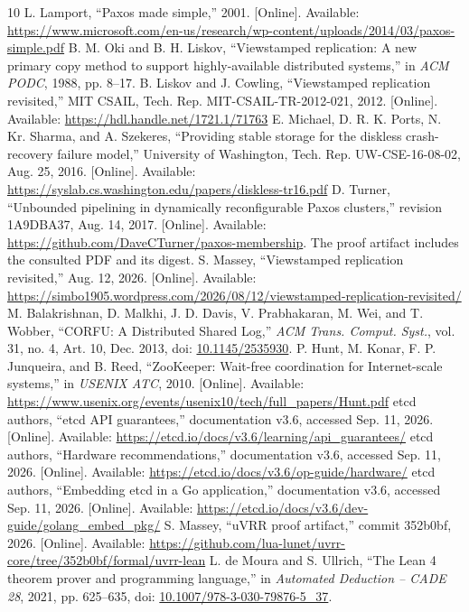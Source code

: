 \documentclass[10pt,journal,letterpaper]{IEEEtran}
\begin{document}
\begin{thebibliography}{10}
 L. Lamport, ``Paxos made simple,'' 2001. [Online]. Available: \url{https://www.microsoft.com/en-us/research/wp-content/uploads/2014/03/paxos-simple.pdf}
 B. M. Oki and B. H. Liskov, ``Viewstamped replication: A new primary copy method to support highly-available distributed systems,'' in \emph{ACM PODC}, 1988, pp. 8--17.
 B. Liskov and J. Cowling, ``Viewstamped replication revisited,'' MIT CSAIL, Tech. Rep. MIT-CSAIL-TR-2012-021, 2012. [Online]. Available: \url{https://hdl.handle.net/1721.1/71763}
 E. Michael, D. R. K. Ports, N. Kr. Sharma, and A. Szekeres, ``Providing stable storage for the diskless crash-recovery failure model,'' University of Washington, Tech. Rep. UW-CSE-16-08-02, Aug. 25, 2016. [Online]. Available: \url{https://syslab.cs.washington.edu/papers/diskless-tr16.pdf}
 D. Turner, ``Unbounded pipelining in dynamically reconfigurable Paxos clusters,'' revision 1A9DBA37, Aug. 14, 2017. [Online]. Available: \url{https://github.com/DaveCTurner/paxos-membership}. The proof artifact includes the consulted PDF and its digest.
 S. Massey, ``Viewstamped replication revisited,'' Aug. 12, 2026. [Online]. Available: \url{https://simbo1905.wordpress.com/2026/08/12/viewstamped-replication-revisited/}
 M. Balakrishnan, D. Malkhi, J. D. Davis, V. Prabhakaran, M. Wei, and T. Wobber, ``CORFU: A Distributed Shared Log,'' \emph{ACM Trans. Comput. Syst.}, vol. 31, no. 4, Art. 10, Dec. 2013, doi: \href{https://doi.org/10.1145/2535930}{10.1145/2535930}.
 P. Hunt, M. Konar, F. P. Junqueira, and B. Reed, ``ZooKeeper: Wait-free coordination for Internet-scale systems,'' in \emph{USENIX ATC}, 2010. [Online]. Available: \url{https://www.usenix.org/events/usenix10/tech/full_papers/Hunt.pdf}
 etcd authors, ``etcd API guarantees,'' documentation v3.6, accessed Sep. 11, 2026. [Online]. Available: \url{https://etcd.io/docs/v3.6/learning/api_guarantees/}
 etcd authors, ``Hardware recommendations,'' documentation v3.6, accessed Sep. 11, 2026. [Online]. Available: \url{https://etcd.io/docs/v3.6/op-guide/hardware/}
 etcd authors, ``Embedding etcd in a Go application,'' documentation v3.6, accessed Sep. 11, 2026. [Online]. Available: \url{https://etcd.io/docs/v3.6/dev-guide/golang_embed_pkg/}
 S. Massey, ``uVRR proof artifact,'' commit 352b0bf, 2026. [Online]. Available: \url{https://github.com/lua-lunet/uvrr-core/tree/352b0bf/formal/uvrr-lean}
 L. de Moura and S. Ullrich, ``The Lean 4 theorem prover and programming language,'' in \emph{Automated Deduction -- CADE 28}, 2021, pp. 625--635, doi: \href{https://doi.org/10.1007/978-3-030-79876-5_37}{10.1007/978-3-030-79876-5\_37}.
\end{thebibliography}
\end{document}

